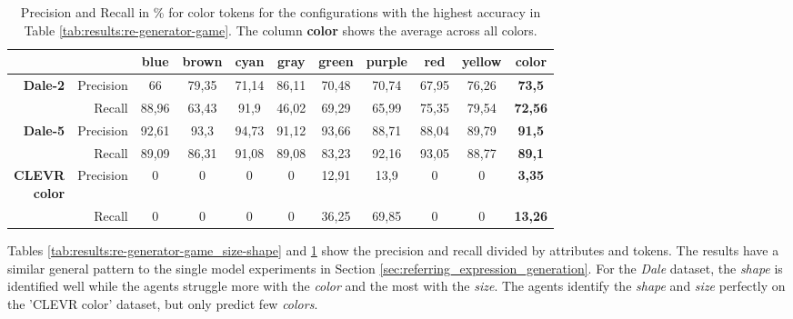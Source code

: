 \begin{table}[ht]
    \centering
    \begin{tabular}{rr|cccccccc|c}
        \toprule
                                         &             & {blue}  & {brown} & {cyan}  & {gray}  & {green} & {purple} & {red}   & {yellow} & \textbf{color}   \\\midrule
        \multirow{2}{*}{\textbf{Dale-2}} & {Precision} & {66}    & {79,35} & {71,14} & {86,11} & {70,48} & {70,74}  & {67,95} & {76,26}  & \textbf{73,5}    \\
                                         & {Recall}    & {88,96} & {63,43} & {91,9}  & {46,02} & {69,29} & {65,99}  & {75,35} & {79,54}  & \textbf{72,56}   \\\midrule
        \multirow{2}{*}{\textbf{Dale-5}} & {Precision} & {92,61} & {93,3}  & {94,73} & {91,12} & {93,66} & {88,71}  & {88,04} & {89,79}  & \textbf{91,5}    \\
                                         & {Recall}    & {89,09} & {86,31} & {91,08} & {89,08} & {83,23} & {92,16}  & {93,05} & {88,77}  & {\textbf{89,1}}  \\\midrule
        \multirowcell{2}[0pt][r]{\textbf{CLEVR}                                                                                                             \\\textbf{color}} & {Precision}           & {0} & {0} & {0} & {0} & {12,91} & {13,9}  & {0} & {0}   & \textbf{3,35} \\
                                         & {Recall}    & {0}     & {0}     & {0}     & {0}     & {36,25} & {69,85}  & {0}     & {0}      & {\textbf{13,26}} \\
        \bottomrule
    \end{tabular}
    \caption{Precision and Recall in \% for color tokens for the configurations with the highest accuracy in Table \ref{tab:results:re-generator-game}. The column \textbf{color} shows the average across all colors.}
    \label{tab:results:re-generator-game_color}
\end{table}

Tables \ref{tab:results:re-generator-game_size-shape} and \ref{tab:results:re-generator-game_color} show the precision and recall divided by attributes and tokens.
The results have a similar general pattern to the single model experiments in Section \ref{sec:referring_expression_generation}.
For the \emph{Dale} dataset, the \emph{shape} is identified well while the agents struggle more with the \emph{color} and the most with the \emph{size}.
The agents identify the \emph{shape} and \emph{size} perfectly on the 'CLEVR color' dataset, but only predict few \emph{colors}.

